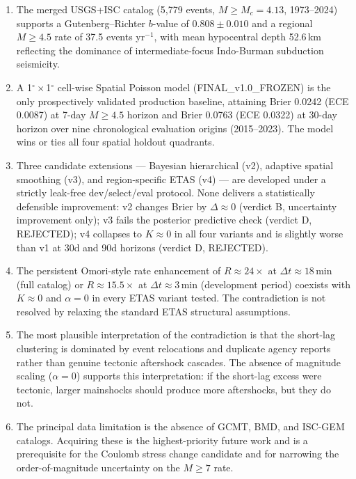 \documentclass[10pt,a4paper,twocolumn]{article}
\begin{document}
\begin{enumerate}[leftmargin=1.2em,itemsep=2pt,topsep=2pt]
\item The merged USGS+ISC catalog (5{,}779 events, $M\geq M_c=4.13$, 1973--2024) supports a Gutenberg--Richter $b$-value of $0.808\pm0.010$ and a regional $M\geq4.5$ rate of 37.5 events yr$^{-1}$, with mean hypocentral depth 52.6\,km reflecting the dominance of intermediate-focus Indo-Burman subduction seismicity.

\item A 1$^\circ\times$1$^\circ$ cell-wise Spatial Poisson model (FINAL\_v1.0\_FROZEN) is the only prospectively validated production baseline, attaining Brier 0.0242 (ECE 0.0087) at 7-day $M\geq4.5$ horizon and Brier 0.0763 (ECE 0.0322) at 30-day horizon over nine chronological evaluation origins (2015--2023). The model wins or ties all four spatial holdout quadrants.

\item Three candidate extensions --- Bayesian hierarchical (v2), adaptive spatial smoothing (v3), and region-specific ETAS (v4) --- are developed under a strictly leak-free dev/select/eval protocol. None delivers a statistically defensible improvement: v2 changes Brier by $\Delta\approx0$ (verdict B, uncertainty improvement only); v3 fails the posterior predictive check (verdict D, REJECTED); v4 collapses to $K\approx0$ in all four variants and is slightly worse than v1 at 30d and 90d horizons (verdict D, REJECTED).

\item The persistent Omori-style rate enhancement of $R\approx24\times$ at $\Delta t\approx18$\,min (full catalog) or $R\approx15.5\times$ at $\Delta t\approx3$\,min (development period) coexists with $K\approx0$ and $\alpha=0$ in every ETAS variant tested. The contradiction is not resolved by relaxing the standard ETAS structural assumptions.

\item The most plausible interpretation of the contradiction is that the short-lag clustering is dominated by event relocations and duplicate agency reports rather than genuine tectonic aftershock cascades. The absence of magnitude scaling ($\alpha=0$) supports this interpretation: if the short-lag excess were tectonic, larger mainshocks should produce more aftershocks, but they do not.

\item The principal data limitation is the absence of GCMT, BMD, and ISC-GEM catalogs. Acquiring these is the highest-priority future work and is a prerequisite for the Coulomb stress change candidate and for narrowing the order-of-magnitude uncertainty on the $M\geq7$ rate.
\end{enumerate}
\end{document}
